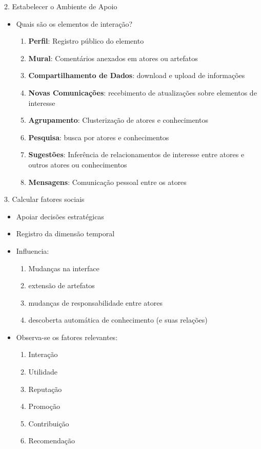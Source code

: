 \documentclass[10pt, compress,british,xcolor={svgnames,dvipsnames,x11names},trans]{beamer}
\begin{document}
\begin{frame}{2. Estabelecer o Ambiente de Apoio}
	\begin{itemize}
		\item Quais são os elementos de interação?
      \begin{enumerate}
          \item \textbf{Perfil}: Registro público do elemento
          \item \textbf{Mural}: Comentários anexados em atores ou artefatos
          \item \textbf{Compartilhamento de Dados}: download e upload de informações
          \item \textbf{Novas Comunicações}: recebimento de atualizações sobre elementos de interesse
          \item \textbf{Agrupamento}: Clusterização de atores e conhecimentos
          \item \textbf{Pesquisa}: busca por atores e conhecimentos
          \item \textbf{Sugestões}: Inferência de relacionamentos de interesse entre atores e outros atores ou conhecimentos
          \item \textbf{Mensagens}: Comunicação pessoal entre os atores
      \end{enumerate}
	\end{itemize}
\end{frame}

\begin{frame}{3. Calcular fatores sociais}
  \begin{itemize}
    \item Apoiar decisões estratégicas
    \item Registro da dimensão temporal
    \item Influencia:
      \begin{enumerate}
        \item Mudanças na interface
        \item extensão de artefatos
        \item mudanças de responsabilidade entre atores
        \item descoberta automática de conhecimento (e suas relações)
      \end{enumerate}
      \item Observa-se os fatores relevantes:
      \begin{enumerate}
        \item Interação
        \item Utilidade
        \item Reputação
        \item Promoção
        \item Contribuição
        \item Recomendação
      \end{enumerate}
  \end{itemize}
\end{frame}
\end{document}

